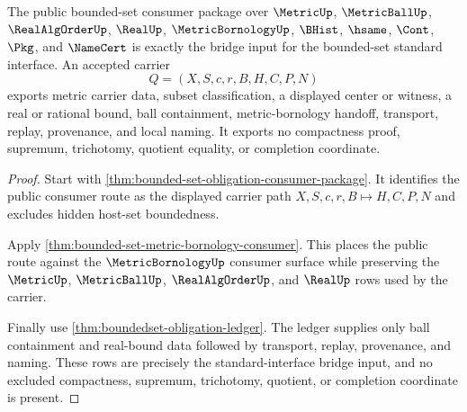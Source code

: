 \begin{theorem}
\label{thm:bounded-set-standard-interface-bridge}
The public bounded-set consumer package over $\MetricUp$, $\MetricBallUp$, $\RealAlgOrderUp$, $\RealUp$, $\MetricBornologyUp$, $\BHist$, $\hsame$, $\Cont$, $\Pkg$, and $\NameCert$ is exactly the bridge input for the bounded-set standard interface. An accepted carrier
$$
Q=(X,S,c,r,B,H,C,P,N)
$$
exports metric carrier data, subset classification, a displayed center or witness, a real or rational bound, ball containment, metric-bornology handoff, transport, replay, provenance, and local naming. It exports no compactness proof, supremum, trichotomy, quotient equality, or completion coordinate.
\end{theorem}
\begin{proof}
Start with \autoref{thm:bounded-set-obligation-consumer-package}. It identifies the public consumer route as the displayed carrier path $X,S,c,r,B \longmapsto H,C,P,N$ and excludes hidden host-set boundedness.

Apply \autoref{thm:bounded-set-metric-bornology-consumer}. This places the public route against the $\MetricBornologyUp$ consumer surface while preserving the $\MetricUp$, $\MetricBallUp$, $\RealAlgOrderUp$, and $\RealUp$ rows used by the carrier.

Finally use \autoref{thm:boundedset-obligation-ledger}. The ledger supplies only ball containment and real-bound data followed by transport, replay, provenance, and naming. These rows are precisely the standard-interface bridge input, and no excluded compactness, supremum, trichotomy, quotient, or completion coordinate is present.
\end{proof}


